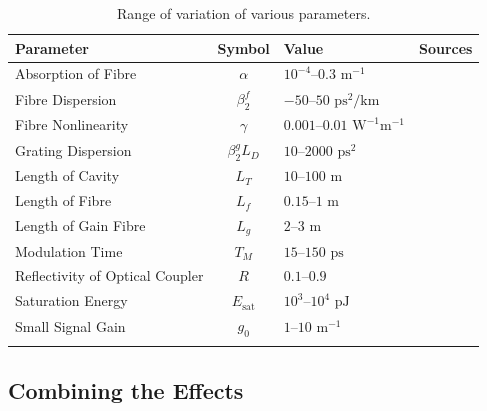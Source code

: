 \documentclass[9pt,twocolumn,twoside]{osajnl}
\newcommand{\Es}{E_{\textrm{sat}}} %
\begin{document}
\begin{table}[tbp]
	\centering
	\caption{Range of variation of various parameters.}
 	\label{tab:values}
 	\begin{tabular}{lcll}
		\hline\noalign{\smallskip}
		Parameter & Symbol & Value & Sources \\
		\hline\noalign{\smallskip}
		Absorption of Fibre & $\alpha$ & $10^{-4}$--$0.3\text{ m}^{-1}$  &~\cite{burgoyneemail, shtyrina2017, tomlinson1984, usechak2005} \\
		Fibre Dispersion & $\beta_2^f$ & $-50$--$50 \text{ ps}^2/ \text{km}$ &~\cite{agrawal2002, agrawal2013, burgoyne2014} \\
		Fibre Nonlinearity & $\gamma$ & $0.001$--$0.01 \text{ W}^{-1} \text{m}^{-1}$ &~\cite{agrawal2013, finot2008, usechak2005} \\
		Grating Dispersion & $\beta_2^g L_D$ & $10$--$2000 \text{ ps}^2$ &~\cite{agrawal2002, agrawal2013, burgoyne2014} \\
		Length of Cavity & $L_T$ & $10$--$100 \text{ m}$ &~\cite{burgoyneemail, tamura1996} \\
		Length of Fibre & $L_f$ & $0.15$--$1 \text{ m}$ &~\cite{burgoyneemail} \\
		Length of Gain Fibre & $L_g$ & $2$--$3 \text{ m}$ &~\cite{burgoyne2014, shtyrina2017} \\
		Modulation Time & $T_M$ & $15$--$150 \text{ ps}$ &~\cite{bohun2015, burgoyneemail, burgoyne2014} \\
		Reflectivity of Optical Coupler & $R$ & $0.1$--$0.9$ &~\cite{burgoyneemail, tamura1996, yamashita2009} \\
		Saturation Energy & $\Es$ & $10^3$--$10^4 \text{ pJ}$ &~\cite{burgoyneemail, usechak2005} \\
		Small Signal Gain & $g_0$ & $1$--$10 \text{ m}^{-1}$ &~\cite{burgoyneemail} \\
		\noalign{\smallskip}\hline
	\end{tabular}
\end{table}

\subsection{Combining the Effects}
\label{sec:effects}
\end{document}
